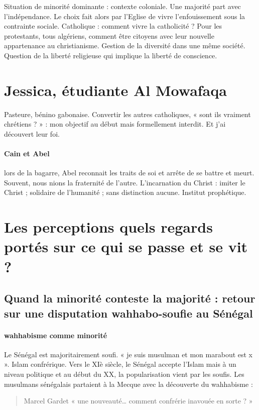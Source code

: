 \begin{Synthesis}
Situation de minorité dominante : contexte coloniale. Une majorité part avec l’indépendance. Le choix fait alors par l’Eglise de vivre l’enfouissement sous la contrainte sociale. Catholique : comment vivre la catholicité ? Pour les protestants, tous algériens, comment être citoyens avec leur nouvelle appartenance au christianisme.
Gestion de la diversité dans une même société. Question de la liberté religieuse qui implique la liberté de conscience.
\end{Synthesis}
\section{Jessica, étudiante Al Mowafaqa}
Pasteure, bénino gabonaise.
Convertir les autres catholiques, « sont ils vraiment chrétiens ? » : mon objectif au début mais formellement interdit. Et j’ai découvert leur foi.
\paragraph{Cain et Abel} lors de la bagarre, Abel reconnait les traits de soi et arrête de se battre et meurt.  Souvent, nous nions la fraternité de l’autre.
L’incarnation du Christ : imiter le Christ ; solidaire de l’humanité ; sans distinction aucune. Institut prophétique. 








\section{Les perceptions quels regards portés sur ce qui se passe et se vit ?}
\mn{}
\subsection{Quand la minorité conteste la majorité : retour sur une disputation wahhabo-soufie au Sénégal}

\paragraph{wahhabisme comme minorité} Le Sénégal est majoritairement soufi.  « je suis musulman et mon marabout est x ». Islam confrérique. Vers le XIè siècle, le Sénégal accepte l’Islam mais à un niveau politique et au début du XX, la popularisation vient par les soufis. Les musulmans sénégalais partaient à la Mecque avec la découverte du wahhabisme : 
\begin{quote}
Marcel Gardet « une nouveauté… comment confrérie inavouée en sorte ? »
\end{quote}
